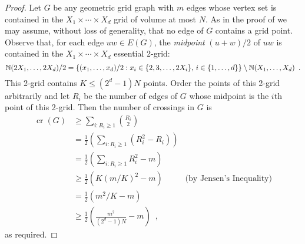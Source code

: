 \documentclass[12pt]{article}
\newcommand{\n}{N}
\DeclareMathOperator{\crs}{cr}
\begin{document}
\begin{proof}
  Let $G$ be any geometric grid graph with $m$ edges whose vertex set is
  contained in the $X_1\times \cdots\times X_d$ grid of volume at most
  $\n$.  As in the proof of  we may assume, without
  loss of generality, that no edge of $G$ contains a grid point. Observe
  that, for each edge $uw\in E(G)$, the \emph{midpoint} $(u+w)/2$ of $uw$
  is contained in the $X_1\times\cdots\times X_d$ essential 2-grid:
  \[
    \mathbb{N}(2X_1,\ldots,2X_d)/2=\{(x_1,\ldots,x_d)/2:
         \mbox{$x_i \in \{2,3,\ldots,2X_i\}$, 
               $i\in\{1,\ldots,d\}$}\} \setminus \mathbb{N}(X_1,\ldots,X_d)\enspace .
  \]
  This 2-grid contains $K\le (2^d-1)\n$ points. Order the points of
  this 2-grid arbitrarily and let $R_i$ be the number of edges of $G$
  whose midpoint is the $i$th point of this 2-grid. Then the number of
  crossings in $G$ is
  \begin{align*}
   \crs(G) &\ge \sum_{i:R_i\ge 1}\binom{R_i}{2} \\
    & = \frac{1}{2}\left(\sum_{i:R_i\ge 1}(R_i^2-R_i)\right) \\
    & = \frac{1}{2}\left(\sum_{i:R_i\ge 1} R_i^2 - m\right) \\
    & \ge \frac{1}{2}\left(K(m/K)^2 - m\right) & \text{(by Jensen's Inequality)}\\
    & = \frac{1}{2}\left(m^2/K - m\right) \\
    & \ge \frac{1}{2}\left(\frac{m^2}{(2^{d}-1)\n} - m\right) \enspace ,
  \end{align*}
  as required.
%
\end{proof}
\end{document}
